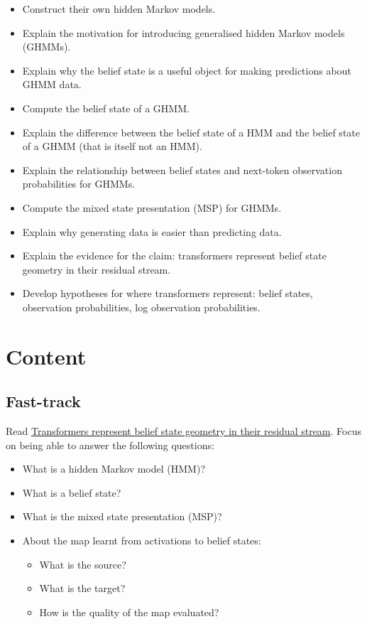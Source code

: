 \documentclass[11pt]{article}
\begin{document}
\begin{learningoutcomes}
\begin{itemize}
\item
  Construct their own hidden Markov models.
\item
  Explain the motivation for introducing generalised hidden Markov models (GHMMs).
\item
  Explain why the belief state is a useful object for making predictions about GHMM data.
\item
  Compute the belief state of a GHMM.
\item
  Explain the difference between the belief state of a HMM and the belief state of a GHMM (that is itself not an HMM).
\item
  Explain the relationship between belief states and next-token observation probabilities for GHMMs.
\item
  Compute the mixed state presentation (MSP) for GHMMs.
\item
  Explain why generating data is easier than predicting data.
\item
  Explain the evidence for the claim: transformers represent belief state geometry in their residual stream.
\item
  Develop hypotheses for where transformers represent: belief states, observation probabilities, log observation probabilities.
\end{itemize}
\end{learningoutcomes}

\section{Content}\label{content}

\subsection{Fast-track}\label{fast-track}

Read \href{https://arxiv.org/pdf/2405.15943}{Transformers represent belief state geometry in their residual stream}. Focus on being able to answer the following questions:

\begin{itemize}
\item
  What is a hidden Markov model (HMM)?
\item
  What is a belief state?
\item
  What is the mixed state presentation (MSP)?
\item
  About the map learnt from activations to belief states:
  \begin{itemize}
  \item
    What is the source?
  \item
    What is the target?
  \item
    How is the quality of the map evaluated?
  \end{itemize}
\end{itemize}
\end{document}
